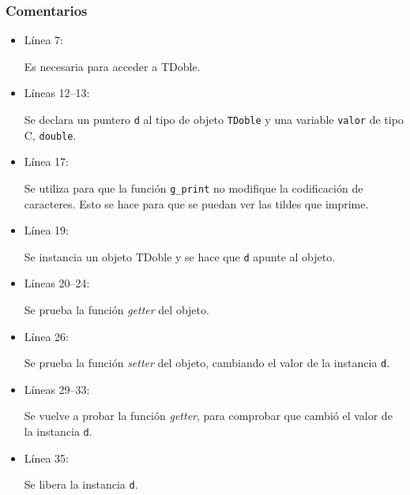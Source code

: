 \subsubsection{Comentarios}
\begin{itemize}
\item Línea 7:\par
  Es necesaria para acceder a \textsf{TDoble}.
\item Líneas 12--13:\par
  Se declara un puntero \texttt{d} al tipo de objeto \texttt{TDoble} y una variable \texttt{valor} de tipo C,
  \texttt{double}.
\item Línea 17:\par
  Se utiliza para que la función \texttt{g\_print} no modifique la codificación de caracteres. Esto se hace
  para que se puedan ver las tildes que imprime.
\item Línea 19:\par
  Se instancia un objeto \textsf{TDoble} y se hace que \texttt{d} apunte al objeto.
\item Líneas 20--24:\par
  Se prueba la función \textit{getter} del objeto.
\item Línea 26:\par
  Se prueba la función \textit{setter} del objeto, cambiando el valor de la instancia \texttt{d}.
\item Líneas 29--33:\par
  Se vuelve a probar la función \textit{getter}, para comprobar que cambió el valor de la instancia \texttt{d}.
\item Línea 35:\par
  Se libera la instancia \texttt{d}.
\end{itemize}





